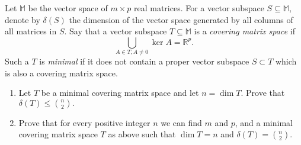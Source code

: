 \documentclass{article}
\begin{document}
\setlength{\parindent}{0pt}
Let $\mathbb{M}$ be the vector space of $m\times p$ real matrices. For a vector subspace $S\subseteq\mathbb{M}$, denote by $\delta(S)$ the dimension of the vector space generated by all columns of all matrices in $S$.\newline
Say that a vector subspace $T\subseteq\mathbb{M}$ is a \emph{covering matrix space} if$$\bigcup_{A\in T,A\ne0}\ker A=\mathbb{R}^{p}.$$Such a $T$ is \emph{minimal} if it does not contain a proper vector subspace $S\subset T$ which is also a covering matrix space.
\begin{enumerate}[label=(\alph*)]
\item Let $T$ be a minimal covering matrix space and let $n=\dim T$. Prove that $\delta(T)\le\binom{n}{2}.$
\item Prove that for every positive integer $n$ we can find $m$ and $p$, and a minimal covering matrix space $T$ as above such that $\dim T=n$ and $\delta(T)=\binom{n}{2}.$
\end{enumerate}
\end{document}
